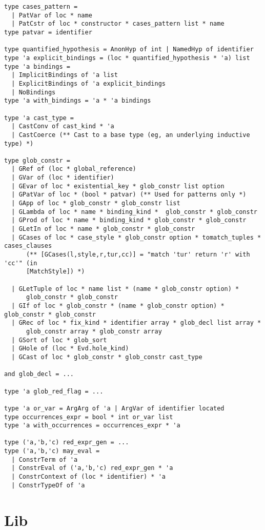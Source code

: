 \documentclass[a4paper,oneside]{book}
\begin{document}
\begin{lstlisting}
type cases_pattern =
  | PatVar of loc * name
  | PatCstr of loc * constructor * cases_pattern list * name 
type patvar = identifier

type quantified_hypothesis = AnonHyp of int | NamedHyp of identifier
type 'a explicit_bindings = (loc * quantified_hypothesis * 'a) list
type 'a bindings =
  | ImplicitBindings of 'a list
  | ExplicitBindings of 'a explicit_bindings
  | NoBindings
type 'a with_bindings = 'a * 'a bindings

type 'a cast_type =
  | CastConv of cast_kind * 'a
  | CastCoerce (** Cast to a base type (eg, an underlying inductive type) *)

type glob_constr =
  | GRef of (loc * global_reference)
  | GVar of (loc * identifier)
  | GEvar of loc * existential_key * glob_constr list option
  | GPatVar of loc * (bool * patvar) (** Used for patterns only *)
  | GApp of loc * glob_constr * glob_constr list
  | GLambda of loc * name * binding_kind *  glob_constr * glob_constr
  | GProd of loc * name * binding_kind * glob_constr * glob_constr
  | GLetIn of loc * name * glob_constr * glob_constr
  | GCases of loc * case_style * glob_constr option * tomatch_tuples * cases_clauses
      (** [GCases(l,style,r,tur,cc)] = "match 'tur' return 'r' with 'cc'" (in 
	  [MatchStyle]) *)

  | GLetTuple of loc * name list * (name * glob_constr option) *
      glob_constr * glob_constr
  | GIf of loc * glob_constr * (name * glob_constr option) * glob_constr * glob_constr
  | GRec of loc * fix_kind * identifier array * glob_decl list array *
      glob_constr array * glob_constr array
  | GSort of loc * glob_sort
  | GHole of (loc * Evd.hole_kind)
  | GCast of loc * glob_constr * glob_constr cast_type

and glob_decl = ...

type 'a glob_red_flag = ...

type 'a or_var = ArgArg of 'a | ArgVar of identifier located
type occurrences_expr = bool * int or_var list
type 'a with_occurrences = occurrences_expr * 'a

type ('a,'b,'c) red_expr_gen = ...
type ('a,'b,'c) may_eval =
  | ConstrTerm of 'a
  | ConstrEval of ('a,'b,'c) red_expr_gen * 'a
  | ConstrContext of (loc * identifier) * 'a
  | ConstrTypeOf of 'a
\end{lstlisting}

\section{Lib}
\end{document}
